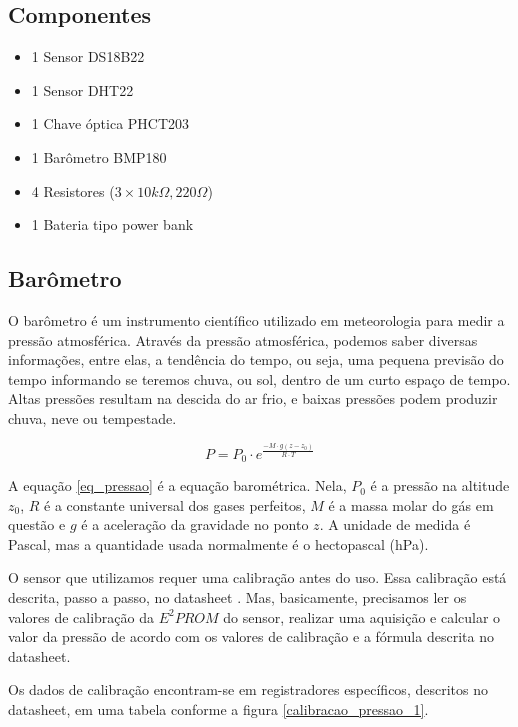 \documentclass[twocolumn,11pt]{article}
\begin{document}
{\subsection{Componentes}\label{desenvolvimento_componentes}
\begin{itemize}
\item 1 Sensor DS18B22
\item 1 Sensor DHT22
\item 1 Chave óptica PHCT203
\item 1 Barômetro BMP180
\item 4 Resistores (\(3 \times 10 k\Omega, 220 \Omega\))
\item 1 Bateria tipo power bank
\end{itemize}

\subsection{Barômetro}\label{desenvolvimento_barometro}
O barômetro é um instrumento científico utilizado em meteorologia para medir a pressão atmosférica. Através da pressão atmosférica, podemos saber diversas informações, entre elas, a tendência do tempo, ou seja, uma pequena previsão do tempo informando se teremos chuva, ou sol, dentro de um curto espaço de tempo. Altas pressões resultam na descida do ar frio, e baixas pressões podem produzir chuva, neve ou tempestade.\par

\begin{equation}\label{eq_pressao}
P=P_0 \cdot e^\frac{-M \cdot g(z-z_0)}{R \cdot T}
\end{equation}

A equação \ref{eq_pressao} é a equação barométrica. Nela, $P_0$ é a pressão na altitude $z_0$, $R$ é a constante universal dos gases perfeitos, $M$ é a massa molar do gás em questão e $g$ é a aceleração da gravidade no ponto $z$. A unidade de medida é Pascal, mas a quantidade usada normalmente é o hectopascal (hPa).\par

O sensor que utilizamos requer uma calibração antes do uso. Essa calibração está descrita, passo a passo, no datasheet \cite{bmp180ds}. Mas, basicamente, precisamos ler os valores de calibração da $E^2PROM$ do sensor, realizar uma aquisição e calcular o valor da pressão de acordo com os valores de calibração e a fórmula descrita no datasheet.\par

Os dados de calibração encontram-se em registradores específicos, descritos no datasheet, em uma tabela conforme a figura \ref{calibracao_pressao_1}.

}
\end{document}
